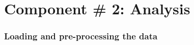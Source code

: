 \documentclass[11pt,a3paper]{article}
\makeatletter
\newcommand{\boxspacing}{\kern\kvtcb@left@rule\kern\kvtcb@boxsep}
\newcommand{\prompt}[4]{
        {\ttfamily\llap{{\color{#2}[#3]:\hspace{3pt}#4}}\vspace{-\baselineskip}}
    }
\makeatother
\begin{document}
    \begin{center}
    \end{center}
    { \hspace*{\fill} \\}
    
    \begin{tcolorbox}[breakable, size=fbox, boxrule=1pt, pad at break*=1mm,colback=cellbackground, colframe=cellborder]
\prompt{In}{incolor}{ }{\boxspacing}
\begin{Verbatim}[commandchars=\\\{\}]

\end{Verbatim}
\end{tcolorbox}

    \hypertarget{component-2-analysis}{%
\section{Component \# 2: Analysis}\label{component-2-analysis}}

    \hypertarget{loading-and-pre-processing-the-data}{%
\subsubsection{Loading and pre-processing the
data}\label{loading-and-pre-processing-the-data}}
\end{document}
